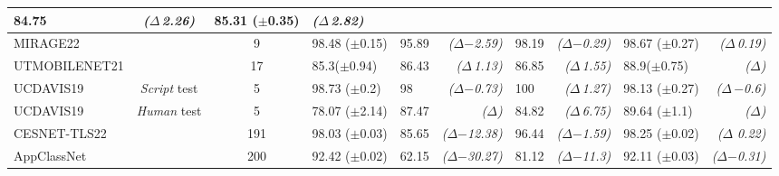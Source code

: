 \documentclass[lettersize,journal,twoside,article]{IEEEtran}
\begin{document}
\begin{table}[!ht]
\begin{threeparttable}
\begin{NiceTabular}{|l|c|c|l|lr|lr|lr|}
 84.75 &
 \textit{($\Delta$\:\:\:\:\,2.26)} &
 85.31 \scriptsize{($\pm$0.35)} &
 \textit{($\Delta$\:\:\:\,2.82)} 
\\ \hline
MIRAGE22 &
& 
9&
98.48 \scriptsize{($\pm$0.15)} &
 95.89 & 
 \textit{($\Delta$\:\:\:$-$2.59)} &
 98.19 &
 \textit{($\Delta$\:$-$0.29)} &
 98.67 \scriptsize{($\pm$0.27)} &
 \textit{($\Delta$\:\:\:\,0.19)}
\\ \hline
UTMOBILENET21 &
&
17&
85.3\:\:\:\:\scriptsize{($\pm$0.94)} & 
 86.43 & 
 \textit{($\Delta$\:\:\:\:\:\:\,1.13)} & 
 86.85 & 
 \textit{($\Delta$\:\:\:\:\,1.55)} & 
 88.9\:\:\:\:\scriptsize{($\pm$0.75)} & 
 \textit{($\Delta$\:\:\:\:\:)}  
\\ \hline
UCDAVIS19&
\textit{Script} test& 
5&
98.73 \scriptsize{($\pm$0.2)} & 
 98 & 
 \textit{($\Delta$\:\:\:$-$0.73)} & 
 100 & 
 \textit{($\Delta$\:\:\:\:\,1.27)} & 
 98.13 \scriptsize{($\pm$0.27)} & 
 \textit{($\Delta$\:\:\,$-$0.6)} 
\\ \hline
UCDAVIS19 &
\textit{Human} test&
5&
78.07 \scriptsize{($\pm$2.14)} &
 87.47 & 
 \textit{($\Delta$\:\:\:\:\:\:\:\:)} & 
 84.82 &
 \textit{($\Delta$\:\:\:\:\,6.75)} &
 89.64 \scriptsize{($\pm$1.1)} &
 \textit{($\Delta$\:)}
\\ \hline
CESNET-TLS22  &
& 
191&
98.03 \scriptsize{($\pm$0.03)} &
 85.65 & 
 \textit{($\Delta$\:$-$12.38)} & 
 96.44 &
 \textit{($\Delta$\:$-$1.59)} &
 98.25 \scriptsize{($\pm$0.02)} &
 \textit{($\Delta$\:\:\:\,\,0.22)}
\\ \hline 
AppClassNet  &
& 
200&
92.42 \scriptsize{($\pm$0.02)} &
 62.15 & 
 \textit{($\Delta$\:$-$30.27)} & 
 81.12 &
 \textit{($\Delta$\:$-$11.3)} &
 92.11 \scriptsize{($\pm$0.03)} &
 \textit{($\Delta$\:$-$0.31)} 
\\ \hline 


\end{NiceTabular}
\end{threeparttable}
\end{table}
\end{document}
